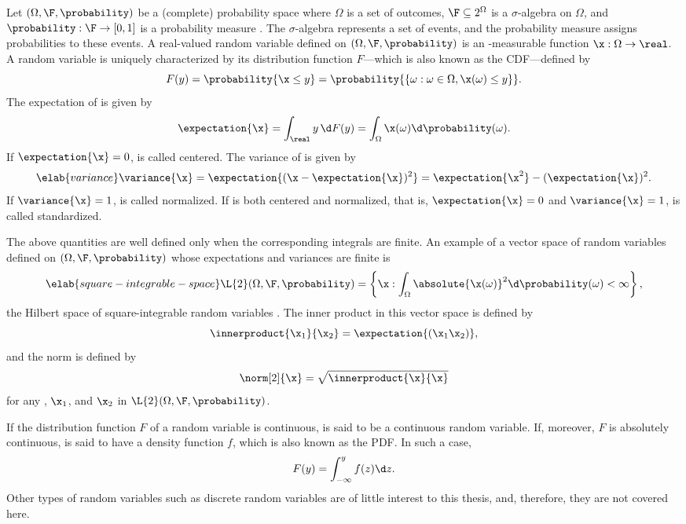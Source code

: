 Let $(\Omega, \F, \probability)$ be a (complete) probability space where
$\Omega$ is a set of outcomes, $\F \subseteq 2^\Omega$ is a $\sigma$-algebra on
$\Omega$, and $\probability: \F \to [0, 1]$ is a probability measure
\cite{durrett2010}. The $\sigma$-algebra represents a set of events, and the
probability measure assigns probabilities to these events. A real-valued random
variable defined on $(\Omega, \F, \probability)$ is an \F-measurable function
$\x: \Omega \to \real$. A random variable \x is uniquely characterized by its
distribution function $F$---which is also known as the \ac{CDF}---defined by
\begin{equation*}
  F(y) = \probability{\x \leq y} = \probability{\{ \omega: \omega \in \Omega, \x(\omega) \leq y \}}.
\end{equation*}
The expectation of \x is given by
\[
  \expectation{\x} = \int_\real y \, \d F(y) = \int_\Omega \x(\omega) \d \probability(\omega).
\]
If $\expectation{\x} = 0$, \x is called centered. The variance of \x is given
by
\begin{equation} \elab{variance}
  \variance{\x}
  = \expectation{(\x - \expectation{\x})^2}
  = \expectation{\x^2} - (\expectation{\x})^2.
\end{equation}
If $\variance{\x} = 1$, \x is called normalized. If \x is both centered and
normalized, that is, $\expectation{\x} = 0$ and $\variance{\x} = 1$, \x is
called standardized.

The above quantities are well defined only when the corresponding integrals are
finite. An example of a vector space of random variables defined on $(\Omega,
\F, \probability)$ whose expectations and variances are finite is
\begin{equation} \elab{square-integrable-space}
  \L{2}(\Omega, \F, \probability) = \left\{ \x: \int_\Omega \absolute{\x(\omega)}^2 \d \probability(\omega) < \infty \right\},
\end{equation}
the Hilbert space of square-integrable random variables \cite{janson1997}. The
inner product in this vector space is defined by
\[
  \innerproduct{\x_1}{\x_2} = \expectation{(\x_1 \x_2)},
\]
and the norm is defined by
\[
  \norm[2]{\x} = \sqrt{\innerproduct{\x}{\x}}
\]
for any \x, $\x_1$, and $\x_2$ in $\L{2}(\Omega, \F, \probability)$.

If the distribution function $F$ of a random variable \x is continuous, \x is
said to be a continuous random variable. If, moreover, $F$ is absolutely
continuous, \x is said to have a density function $f$, which is also known as
the \ac{PDF}. In such a case,
\[
  F(y) = \int_{-\infty}^y f(z) \d z.
\]
Other types of random variables such as discrete random variables are of little
interest to this thesis, and, therefore, they are not covered here.

